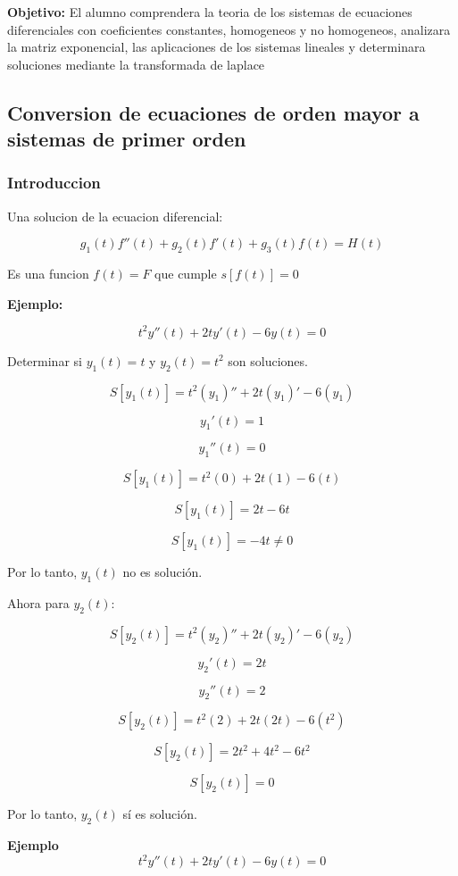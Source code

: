 \documentclass{article}
\begin{document}
\textbf{Objetivo:} El alumno comprendera la teoria de los sistemas de ecuaciones diferenciales con coeficientes constantes, homogeneos y no homogeneos, analizara la matriz exponencial, las aplicaciones de los sistemas lineales y determinara soluciones mediante la transformada de laplace

\subsection{Conversion de ecuaciones de orden mayor a sistemas de primer orden}

\subsubsection*{Introduccion}

Una solucion de la ecuacion diferencial:

\[
    g_1(t)f''(t) + g_2(t)f'(t) + g_3(t)f(t) = H(t)
\]

Es una funcion $f(t) = F$ que cumple $s[f(t)] = 0$

\textbf{Ejemplo:}

\[ t^2 y''(t) + 2t y'(t) - 6y(t) = 0 \]

Determinar si \( y_1(t) = t \) y \( y_2(t) = t^2 \) son soluciones.

\[ S[y_1(t)] = t^2 (y_1)'' + 2t (y_1)' - 6(y_1) \]

\[ y_1'(t) = 1 \]

\[ y_1''(t) = 0 \]

\[ S[y_1(t)] = t^2 (0) + 2t(1) - 6(t) \]

\[ S[y_1(t)] = 2t - 6t \]

\[ S[y_1(t)] = -4t \neq 0 \]

Por lo tanto, \( y_1(t) \) no es solución.

Ahora para \( y_2(t) \):

\[ S[y_2(t)] = t^2 (y_2)'' + 2t (y_2)' - 6(y_2) \]

\[ y_2'(t) = 2t \]

\[ y_2''(t) = 2 \]

\[ S[y_2(t)] = t^2(2) + 2t(2t) - 6(t^2) \]

\[ S[y_2(t)] = 2t^2 + 4t^2 - 6t^2 \]

\[ S[y_2(t)] = 0 \]

Por lo tanto, \( y_2(t) \) sí es solución.

\textbf{Ejemplo}
\begin{equation}
    t^2y''(t) + 2ty'(t) - 6y(t) = 0
\end{equation}
\end{document}
